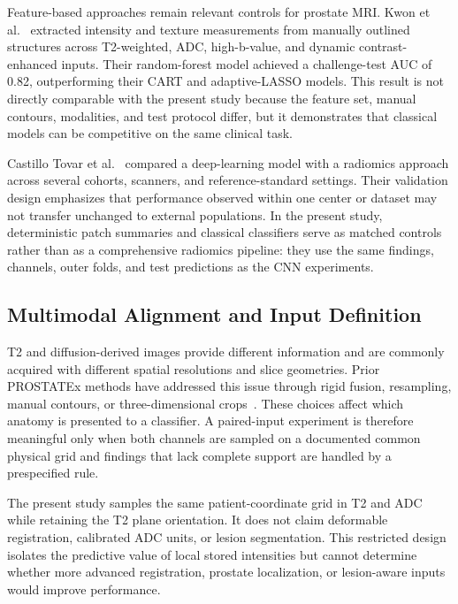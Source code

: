 \documentclass[11pt]{article}
\begin{document}
Feature-based approaches remain relevant controls for prostate MRI. Kwon et al.~\cite{kwon-prostatex} extracted intensity and texture measurements from manually outlined structures across T2-weighted, ADC, high-b-value, and dynamic contrast-enhanced inputs. Their random-forest model achieved a challenge-test AUC of 0.82, outperforming their CART and adaptive-LASSO models. This result is not directly comparable with the present study because the feature set, manual contours, modalities, and test protocol differ, but it demonstrates that classical models can be competitive on the same clinical task.

Castillo Tovar et al.~\cite{castillo-validation} compared a deep-learning model with a radiomics approach across several cohorts, scanners, and reference-standard settings. Their validation design emphasizes that performance observed within one center or dataset may not transfer unchanged to external populations. In the present study, deterministic patch summaries and classical classifiers serve as matched controls rather than as a comprehensive radiomics pipeline: they use the same findings, channels, outer folds, and test predictions as the CNN experiments.

\subsection{Multimodal Alignment and Input Definition}\label{sec:2.4}

T2 and diffusion-derived images provide different information and are commonly acquired with different spatial resolutions and slice geometries. Prior PROSTATEx methods have addressed this issue through rigid fusion, resampling, manual contours, or three-dimensional crops~\cite{mehrtash-prostatex,kwon-prostatex}. These choices affect which anatomy is presented to a classifier. A paired-input experiment is therefore meaningful only when both channels are sampled on a documented common physical grid and findings that lack complete support are handled by a prespecified rule.

The present study samples the same patient-coordinate grid in T2 and ADC while retaining the T2 plane orientation. It does not claim deformable registration, calibrated ADC units, or lesion segmentation. This restricted design isolates the predictive value of local stored intensities but cannot determine whether more advanced registration, prostate localization, or lesion-aware inputs would improve performance.
\end{document}
